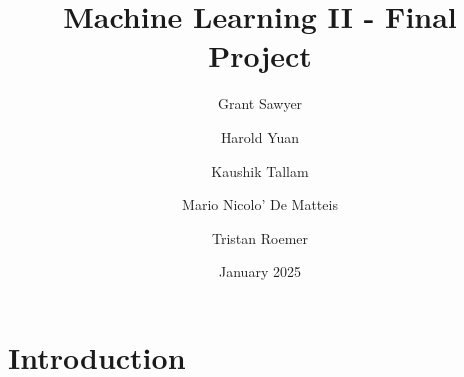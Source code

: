 \documentclass{article}
\title{Machine Learning II - Final Project}
\author[1]{Grant Sawyer}
\author[2]{Harold Yuan}
\author[2]{Kaushik Tallam}
\author[3]{Mario Nicolo' De Matteis}
\author[4]{Tristan Roemer}
\affil[1]{}
\date{January 2025}
\begin{document}
\maketitle

\section{Introduction}
\end{document}
